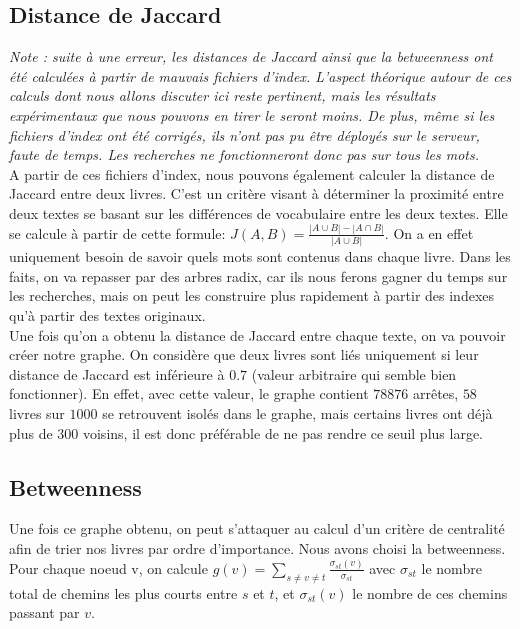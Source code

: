 \documentclass{article}
\begin{document}
\subsection{Distance de Jaccard}

\textit{Note : suite à une erreur, les distances de Jaccard ainsi que la betweenness ont été calculées à partir de mauvais fichiers d'index. L'aspect théorique autour de ces calculs dont nous allons discuter ici reste pertinent, mais les résultats expérimentaux que nous pouvons en tirer le seront moins. De plus, même si les fichiers d'index ont été corrigés, ils n'ont pas pu être déployés sur le serveur, faute de temps. Les recherches ne fonctionneront donc pas sur tous les mots.}\\

A partir de ces fichiers d'index, nous pouvons également calculer la distance de Jaccard entre deux livres. C'est un critère visant à déterminer la proximité entre deux textes se basant sur les différences de vocabulaire entre les deux textes. Elle se calcule à partir de cette formule:
$J(A,B) = \frac{|A \cup B| - |A \cap B|}{|A \cup B|}$. On a en effet uniquement besoin de savoir quels mots sont contenus dans chaque livre. Dans les faits, on va repasser par des arbres radix, car ils nous ferons gagner du temps sur les recherches, mais on peut les construire plus rapidement à partir des indexes qu'à partir des textes originaux.\\

Une fois qu'on a obtenu la distance de Jaccard entre chaque texte, on va pouvoir créer notre graphe. On considère que deux livres sont liés uniquement si leur distance de Jaccard est inférieure à $0.7$ (valeur arbitraire qui semble bien fonctionner). En effet, avec cette valeur, le graphe contient $78876$ arrêtes, $58$ livres sur $1000$ se retrouvent isolés dans le graphe, mais certains livres ont déjà plus de $300$ voisins, il est donc préférable de ne pas rendre ce seuil plus large.

\subsection{Betweenness}

Une fois ce graphe obtenu, on peut s'attaquer au calcul d'un critère de centralité afin de trier nos livres par ordre d'importance. Nous avons choisi la betweenness.
Pour chaque noeud v, on calcule $g(v)= \sum_{s \neq v \neq t}\frac{\sigma_{st}(v)}{\sigma_{st}}$ avec  $\sigma_{st}$ le nombre total de chemins les plus courts entre $s$ et $t$, et  $\sigma_{st}(v)$ le nombre de ces chemins passant par $v$.\\
\end{document}
